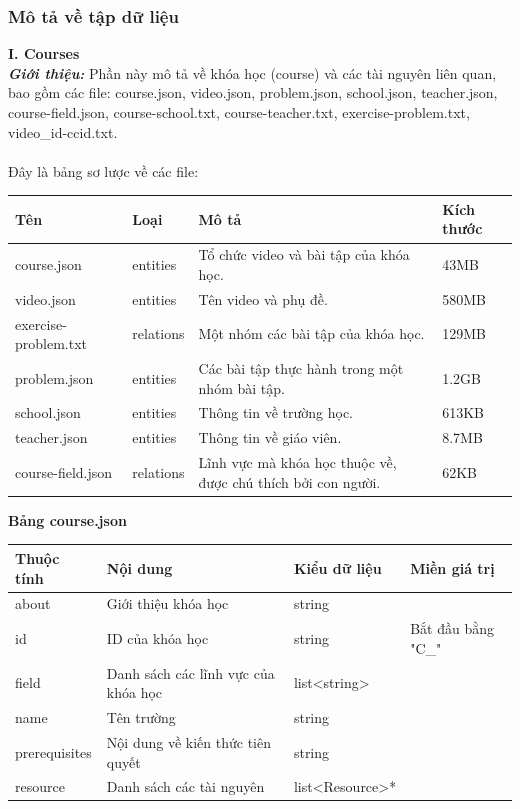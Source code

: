 \subsubsection{Mô tả về tập dữ liệu}
\textbf{I. Courses}\\
\textbf{\textit{Giới thiệu:}} Phần này mô tả về khóa học (course) và các tài nguyên liên quan, bao gồm các file: course.json, video.json, problem.json, school.json, teacher.json, course-field.json, course-school.txt, course-teacher.txt, exercise-problem.txt, video\_id-ccid.txt.\\
\\
Đây là bảng sơ lược về các file:
\begin{center}
\begin{tabular}{|| m{5em}  m{5em}  m{18em}  m{5em}||} 
 \hline
 Tên & Loại & Mô tả & Kích thước \\ [0.5ex] 
 \hline\hline
 course.json & entities & Tổ chức video và bài tập của khóa học. & 43MB \\ 
 \hline
 video.json & entities & Tên video và phụ đề. & 580MB \\
 \hline
 exercise-problem.txt & relations & Một nhóm các bài tập của khóa học. & 129MB \\
 \hline
 problem.json & entities & Các bài tập thực hành trong một nhóm bài tập. & 1.2GB \\
 \hline
 school.json & entities & Thông tin về trường học. & 613KB \\
 \hline
 teacher.json & entities & Thông tin về giáo viên. & 8.7MB \\
 \hline
 course-field.json & relations & Lĩnh vực mà khóa học thuộc về, được chú thích bởi con người. & 62KB \\ [1ex] 
 \hline
\end{tabular}
\end{center}
\newpage
\textbf{Bảng course.json}
\begin{center}
\begin{tabular}{|| m{5em}  m{10em}  m{8em}  m{8em}||} 
 \hline
 Thuộc tính & Nội dung & Kiểu dữ liệu & Miền giá trị \\ [0.5ex] 
 \hline\hline
 about & Giới thiệu khóa học & string &  \\ 
 \hline
 id & ID của khóa học & string & Bắt đầu bằng "C\_" \\
 \hline
 field & Danh sách các lĩnh vực của khóa học & list<string> &  \\
 \hline
 name & Tên trường & string &  \\
 \hline
 prerequisites & Nội dung về kiến thức tiên quyết & string &  \\
 \hline
 resource & Danh sách các tài nguyên & list<Resource>* &  \\ [1ex] 
 \hline
\end{tabular}
\end{center}
